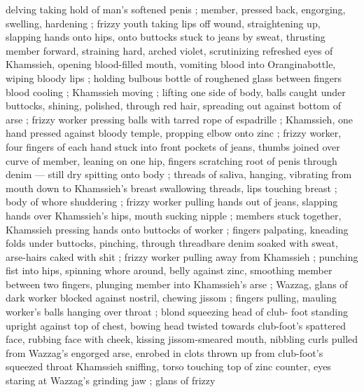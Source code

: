 delving taking hold of man's softened penis ; member, pressed back, engorging, swelling, hardening ; frizzy youth taking lips off wound, straightening up, slapping hands onto hips, onto buttocks stuck to jeans by sweat, thrusting member forward, straining hard, arched violet, scrutinizing refreshed eyes of Khamssieh, opening blood-filled mouth, vomiting blood into Orangina\textregistered bottle, wiping bloody lips  ; holding bulbous bottle of roughened glass between fingers {\col} blood cooling ; Khamssieh moving ; lifting one side of body, balls caught under buttocks, shining, polished, through red hair, spreading out against bottom of arse ; frizzy worker pressing balls with tarred rope of espadrille ; Khamssieh, one hand pressed against bloody temple, propping elbow onto zinc ; frizzy worker, four fingers of each hand stuck into front pockets of jeans, thumbs joined over curve of member, leaning on one hip, fingers scratching root of penis through denim --- still dry {\dashcom} spitting onto body ; threads of saliva, hanging, vibrating from mouth down to Khamssieh's breast {\col} swallowing threads, lips touching breast ; body of whore shuddering ; frizzy worker pulling hands out of jeans, slapping hands over Khamssieh's hips, mouth sucking nipple ; members stuck together, Khamssieh pressing hands onto buttocks of worker ; fingers palpating, kneading folds under buttocks, pinching, through threadbare denim soaked with sweat, arse-hairs caked with shit ; frizzy worker pulling away from Khamssieh ; punching fist into hips, spinning whore around, belly against zinc, smoothing member between two fingers, plunging member into Khamssieh's arse ; Wazzag, glans of dark worker blocked against nostril, chewing jissom ; fingers pulling, mauling worker's balls hanging over throat ; blond squeezing head of club- foot standing upright against top of chest, bowing head twisted towards club-foot's spattered face, rubbing face with cheek, kissing jissom-smeared mouth, nibbling curls pulled from Wazzag's engorged arse, enrobed in clots thrown up from club-foot's squeezed throat {\semislash} Khamssieh sniffing, torso touching top of zinc counter, eyes staring at Wazzag's grinding jaw ; glans of frizzy 
